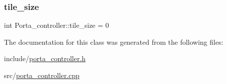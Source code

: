 \subsubsection{\texorpdfstring{tile\+\_\+size}{tile\_size}}
{\footnotesize\ttfamily int Porta\+\_\+controller\+::tile\+\_\+size = 0\hspace{0.3cm}{\ttfamily [private]}}



The documentation for this class was generated from the following files\+:\begin{DoxyCompactItemize}
\item 
include/\hyperlink{porta__controller_8h}{porta\+\_\+controller.\+h}\item 
src/\hyperlink{porta__controller_8cpp}{porta\+\_\+controller.\+cpp}\end{DoxyCompactItemize}
